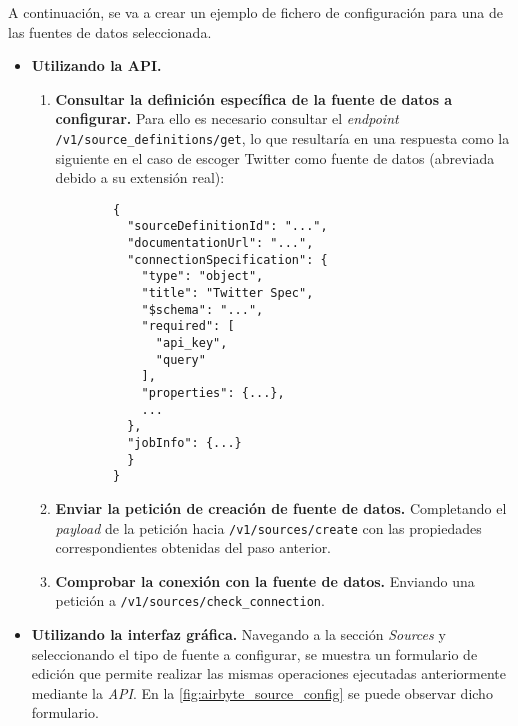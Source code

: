 A continuación, se va a crear un ejemplo de fichero de configuración para una de las fuentes de datos seleccionada.

\begin{itemize}
    
    \item \textbf{Utilizando la API.}
    
    \begin{enumerate}
        
        \item \textbf{Consultar la definición específica de la fuente de datos a configurar.} Para ello es necesario consultar el \textit{endpoint} \verb|/v1/source_definitions/get|, lo que resultaría en una respuesta como la siguiente en el caso de escoger Twitter como fuente de datos (abreviada debido a su extensión real):

        \begin{verbatim}
        {
          "sourceDefinitionId": "...",
          "documentationUrl": "...",
          "connectionSpecification": {
            "type": "object",
            "title": "Twitter Spec",
            "$schema": "...",
            "required": [
              "api_key",
              "query"
            ],
            "properties": {...},
            ...
          },
          "jobInfo": {...}
          }
        }
        \end{verbatim}
        
        \item \textbf{Enviar la petición de creación de fuente de datos.} Completando el \textit{payload} de la petición hacia \verb|/v1/sources/create| con las propiedades correspondientes obtenidas del paso anterior. 
        
        \item \textbf{Comprobar la conexión con la fuente de datos.} Enviando una petición a \verb|/v1/sources/check_connection|.
    
    \end{enumerate}
    
    \item \textbf{Utilizando la interfaz gráfica.} Navegando a la sección \textit{Sources} y seleccionando el tipo de fuente a configurar, se muestra un formulario de edición que permite realizar las mismas operaciones ejecutadas anteriormente mediante la \textit{API}. En la \autoref{fig:airbyte_source_config} se puede observar dicho formulario.

    
\end{itemize}

